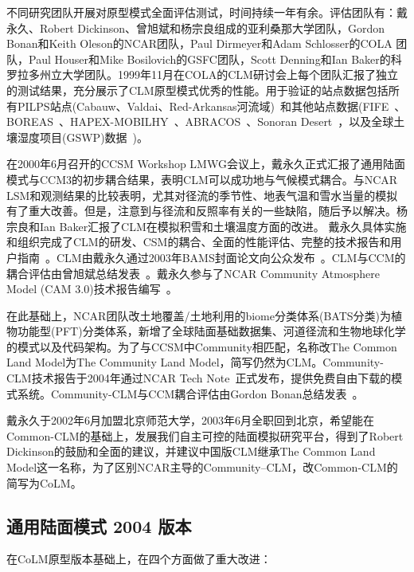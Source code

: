 不同研究团队开展对原型模式全面评估测试，时间持续一年有余。评估团队有：戴永久、Robert Dickinson、曾旭斌和杨宗良组成的亚利桑那大学团队，Gordon Bonan和Keith Oleson的NCAR团队，Paul Dirmeyer和Adam Schlosser的COLA 团队，Paul Houser和Mike Bosilovich的GSFC团队，Scott Denning和Ian Baker的科罗拉多州立大学团队。1999年11月在COLA的CLM研讨会上每个团队汇报了独立的测试结果，充分展示了CLM原型模式优秀的性能。用于验证的站点数据包括所有PILPS站点(Cabauw、Valdai、Red-Arkansas河流域)~\citep{Henderson-Sellers_1993_PILPS}和其他站点数据(FIFE~\citep{Sellers88FIFE}、BOREAS~\citep{Sellers95BOREAS}、HAPEX-MOBILHY~\citep{Andre1986hapex}、ABRACOS~\citep{Gash96ABRACOS}、Sonoran Desert~\citep{Unland1996surface}，以及全球土壤湿度项目(GSWP)数据~\citep{Dirmeyer1999global})。

在2000年6月召开的CCSM Workshop LMWG会议上，戴永久正式汇报了通用陆面模式与CCM3的初步耦合结果，表明CLM可以成功地与气候模式耦合。与NCAR LSM和观测结果的比较表明，尤其对径流的季节性、地表气温和雪水当量的模拟有了重大改善。但是，注意到与径流和反照率有关的一些缺陷，随后予以解决。杨宗良和Ian Baker汇报了CLM在模拟积雪和土壤温度方面的改进。
戴永久具体实施和组织完成了CLM的研发、CSM的耦合、全面的性能评估、完整的技术报告和用户指南~\citep{Dai2001CoLM}。CLM由戴永久通过2003年BAMS封面论文向公众发布~\citep{dai2003common}。CLM与CCM的耦合评估由曾旭斌总结发表~\citep{zeng2002coupling}。戴永久参与了NCAR Community Atmosphere Model (CAM 3.0)技术报告编写~\citep{Collins2004CAM}。

在此基础上，NCAR团队改土地覆盖/土地利用的biome分类体系(BATS分类)为植物功能型(PFT)分类体系，新增了全球陆面基础数据集、河道径流和生物地球化学的模式以及代码架构。为了与CCSM中Community相匹配，名称改The Common Land Model为The Community Land Model，简写仍然为CLM。Community-CLM技术报告于2004年通过NCAR Tech Note~\citep{Oleson2004CLM}正式发布，提供免费自由下载的模式系统。Community-CLM与CCM耦合评估由Gordon Bonan总结发表~\citep{Bonan2002CLM}。

戴永久于2002年6月加盟北京师范大学，2003年6月全职回到北京，希望能在Common-CLM的基础上，发展我们自主可控的陆面模拟研究平台，得到了Robert Dickinson的鼓励和全面的建议，并建议中国版CLM继承The Common Land Model这一名称，为了区别NCAR主导的Community–CLM，改Common-CLM的简写为CoLM。


\subsection{通用陆面模式 2004 版本}
在CoLM原型版本基础上，在四个方面做了重大改进：

